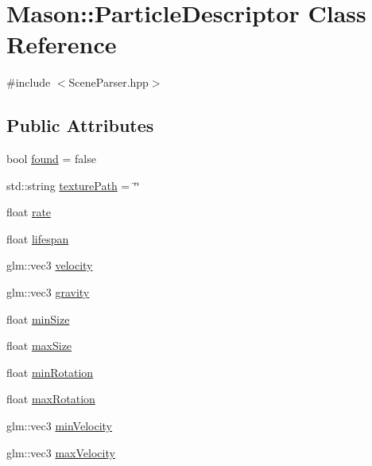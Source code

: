 \hypertarget{class_mason_1_1_particle_descriptor}{}\section{Mason\+:\+:Particle\+Descriptor Class Reference}
\label{class_mason_1_1_particle_descriptor}


{\ttfamily \#include $<$Scene\+Parser.\+hpp$>$}

\subsection*{Public Attributes}
\begin{DoxyCompactItemize}
\item 
bool \hyperlink{class_mason_1_1_particle_descriptor_a4e686866e2431ae666800ead5d1638c4}{found} = false
\item 
std\+::string \hyperlink{class_mason_1_1_particle_descriptor_a060bb2c95075b3a19432beca816bfa76}{texture\+Path} = \char`\"{}\char`\"{}
\item 
float \hyperlink{class_mason_1_1_particle_descriptor_a250f9c2c5b3fa119d0a38311e301fd2a}{rate}
\item 
float \hyperlink{class_mason_1_1_particle_descriptor_ac38adbef0e6dfa77dd42ade2089595fc}{lifespan}
\item 
glm\+::vec3 \hyperlink{class_mason_1_1_particle_descriptor_a015f949d8089667eea16540fb750f70a}{velocity}
\item 
glm\+::vec3 \hyperlink{class_mason_1_1_particle_descriptor_abd5c0046bb19ee434c56f713c58103c3}{gravity}
\item 
float \hyperlink{class_mason_1_1_particle_descriptor_a5bbc1147b832c903cee0b6ebe964d8c3}{min\+Size}
\item 
float \hyperlink{class_mason_1_1_particle_descriptor_a394842f237899eb5fcd3091c8dd2ba89}{max\+Size}
\item 
float \hyperlink{class_mason_1_1_particle_descriptor_a086f4988188e22f066e93529cb02608c}{min\+Rotation}
\item 
float \hyperlink{class_mason_1_1_particle_descriptor_a9590c7ad32834d9cce9c24d530e75609}{max\+Rotation}
\item 
glm\+::vec3 \hyperlink{class_mason_1_1_particle_descriptor_a6412dbc10bc67e2e8b21faef1c050a67}{min\+Velocity}
\item 
glm\+::vec3 \hyperlink{class_mason_1_1_particle_descriptor_afc679429239c6e9c40b5c2e75228e2c1}{max\+Velocity}
\item 

\end{DoxyCompactItemize}
